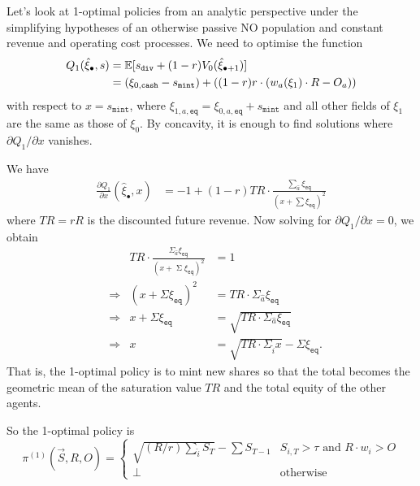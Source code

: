 Let's look at 1-optimal policies from an analytic perspective under the simplifying hypotheses of an otherwise passive NO population and constant revenue and operating cost processes.
%
We need to optimise the function
\begin{align*}
  Q_1(\hat{\xi}_\bullet,s) &= \mathbb{E}[s_\mathtt{div} + (1-r) V_0(\hat{\xi}_{\bullet+1}) ] \\
  &= (\xi_{0,\mathtt{cash}} - s_\mathtt{mint}) + ((1-r) r\cdot (w_a(\xi_1)\cdot R - O_a))
\end{align*}
with respect to $x=s_\mathtt{mint}$, where $\xi_{1,a,\mathtt{eq}}= \xi_{0,a,\mathtt{eq}} + s_\mathtt{mint} $ and all other fields of $\xi_1$ are the same as those of $\xi_0$.
%
By concavity, it is enough to find solutions where $\partial Q_1/\partial x$ vanishes.

We have
\begin{align*}
  \frac{\partial Q_1}{\partial x}(\hat{\xi}_\bullet,x) &= -1 + (1-r) TR \cdot\frac{\sum_{\hat{a}} \xi_\mathtt{eq}}{(x+\sum \xi_\mathtt{eq})^2}
\end{align*}
where $TR=rR$ is the discounted future revenue.
%
Now solving for $\partial Q_1/\partial x = 0$, we obtain
\begin{align*}
  && TR\cdot\frac{\Sigma_{\hat{a}} \xi_\mathtt{eq}}{(x + \mathop{\Sigma} \xi_\mathtt{eq})^2} &= 1 \\
  &\Rightarrow& (x + \Sigma \xi_\mathtt{eq})^2 &= TR \cdot \Sigma_{\hat{a}} \xi_\mathtt{eq} \\
  &\Rightarrow& x + \Sigma \xi_\mathtt{eq} &= \sqrt{ TR\cdot \Sigma_{\hat{a}} \xi_\mathtt{eq} }  \\
  &\Rightarrow& x &= \sqrt{ TR\cdot \Sigma_{\hat{i}} x  } - \Sigma \xi_\mathtt{eq}.
\end{align*}
%
That is, the 1-optimal policy is to mint new shares so that the total becomes the geometric mean of the saturation value $TR$ and the total equity of the other agents.



So the 1-optimal policy is
\[
  \pi^{(1)}(\vec{S},R,O) = \left\{ \begin{array}{ll}
    \sqrt{(R/r)\sum_{\hat{i}}S_T} - \sum S_{T-1} & S_{i,T} > \tau \text { and } R\cdot w_i > O \\
    \bot & \text{otherwise}
  \end{array} \right.
\]



